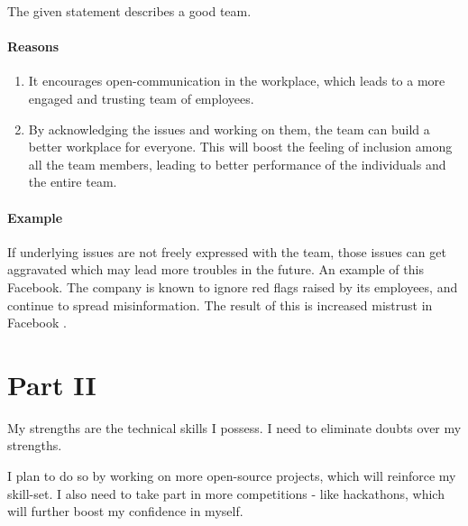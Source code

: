 \documentclass{article}
\begin{document}
The given statement describes a good team.

\paragraph{Reasons}

\begin{enumerate}
\item It encourages open-communication in the workplace, which leads to a more engaged and trusting team of employees.

\item By acknowledging the issues and working on them, the team can build a better workplace for everyone. This will boost the feeling of inclusion among all the team members, leading to better performance of the individuals and the entire team.
\end{enumerate}

\paragraph{Example}
If underlying issues are not freely expressed with the team, those issues can get aggravated which may lead more troubles in the future. An example of this Facebook. The company is known to ignore red flags raised by its employees, and continue to spread misinformation. The result of this is increased mistrust in Facebook \cite{distrustedFacebook}.


\section{Part II}

My strengths are the technical skills I possess. I need to eliminate doubts over my strengths.

I plan to do so by working on more open-source projects, which will reinforce my skill-set. I also need to take part in more competitions - like hackathons, which will further boost my confidence in myself.

\printbibliography
\end{document}
